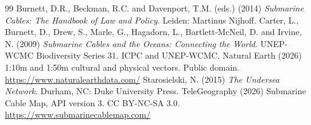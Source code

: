 \documentclass[11pt,a4paper]{article}
\begin{document}
\begin{thebibliography}{99}
 Burnett, D.R., Beckman, R.C. and Davenport, T.M. (eds.) (2014) \emph{Submarine Cables: The Handbook of Law and Policy}. Leiden: Martinus Nijhoff.
 Carter, L., Burnett, D., Drew, S., Marle, G., Hagadorn, L., Bartlett-McNeil, D. and Irvine, N. (2009) \emph{Submarine Cables and the Oceans: Connecting the World}. UNEP-WCMC Biodiversity Series 31. ICPC and UNEP-WCMC.
 Natural Earth (2026) 1:10m and 1:50m cultural and physical vectors. Public domain. \url{https://www.naturalearthdata.com/}
 Starosielski, N. (2015) \emph{The Undersea Network}. Durham, NC: Duke University Press.
 TeleGeography (2026) Submarine Cable Map, API version 3. CC BY-NC-SA 3.0. \url{https://www.submarinecablemap.com/}
\end{thebibliography}
\end{document}
